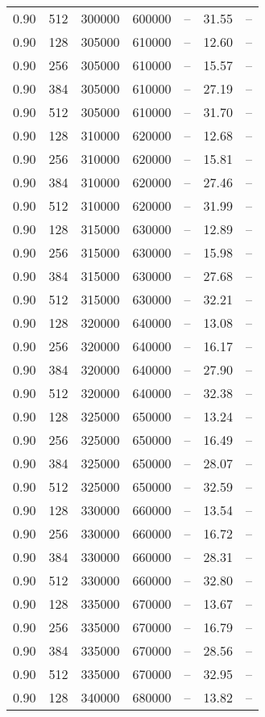\begin{tabular}{l|l|l|l|l|l|l}
0.90 & 512 & 300000 & 600000 & -- & 31.55 & --\\
0.90 & 128 & 305000 & 610000 & -- & 12.60 & --\\
0.90 & 256 & 305000 & 610000 & -- & 15.57 & --\\
0.90 & 384 & 305000 & 610000 & -- & 27.19 & --\\
0.90 & 512 & 305000 & 610000 & -- & 31.70 & --\\
0.90 & 128 & 310000 & 620000 & -- & 12.68 & --\\
0.90 & 256 & 310000 & 620000 & -- & 15.81 & --\\
0.90 & 384 & 310000 & 620000 & -- & 27.46 & --\\
0.90 & 512 & 310000 & 620000 & -- & 31.99 & --\\
0.90 & 128 & 315000 & 630000 & -- & 12.89 & --\\
0.90 & 256 & 315000 & 630000 & -- & 15.98 & --\\
0.90 & 384 & 315000 & 630000 & -- & 27.68 & --\\
0.90 & 512 & 315000 & 630000 & -- & 32.21 & --\\
0.90 & 128 & 320000 & 640000 & -- & 13.08 & --\\
0.90 & 256 & 320000 & 640000 & -- & 16.17 & --\\
0.90 & 384 & 320000 & 640000 & -- & 27.90 & --\\
0.90 & 512 & 320000 & 640000 & -- & 32.38 & --\\
0.90 & 128 & 325000 & 650000 & -- & 13.24 & --\\
0.90 & 256 & 325000 & 650000 & -- & 16.49 & --\\
0.90 & 384 & 325000 & 650000 & -- & 28.07 & --\\
0.90 & 512 & 325000 & 650000 & -- & 32.59 & --\\
0.90 & 128 & 330000 & 660000 & -- & 13.54 & --\\
0.90 & 256 & 330000 & 660000 & -- & 16.72 & --\\
0.90 & 384 & 330000 & 660000 & -- & 28.31 & --\\
0.90 & 512 & 330000 & 660000 & -- & 32.80 & --\\
0.90 & 128 & 335000 & 670000 & -- & 13.67 & --\\
0.90 & 256 & 335000 & 670000 & -- & 16.79 & --\\
0.90 & 384 & 335000 & 670000 & -- & 28.56 & --\\
0.90 & 512 & 335000 & 670000 & -- & 32.95 & --\\
0.90 & 128 & 340000 & 680000 & -- & 13.82 & --\\

\end{tabular}
